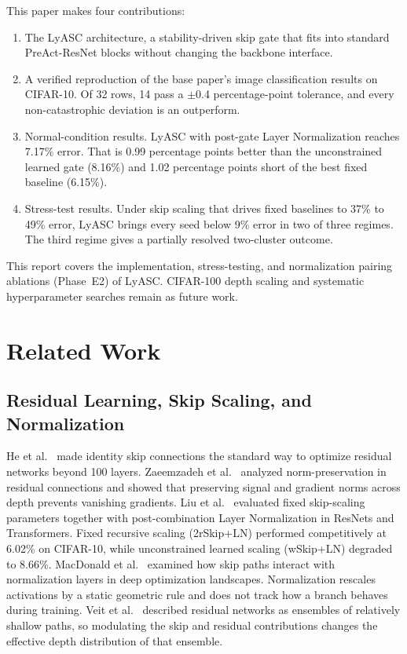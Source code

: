 \documentclass[conference,10pt]{IEEEtran}
\begin{document}
This paper makes four contributions:
\begin{enumerate}
    \item The LyASC architecture, a stability-driven skip gate that
    fits into standard PreAct-ResNet blocks without changing the
    backbone interface.
    \item A verified reproduction of the base paper's image
    classification results on CIFAR-10. Of 32 rows, 14 pass a
    $\pm$0.4 percentage-point tolerance, and every non-catastrophic
    deviation is an outperform.
    \item Normal-condition results. LyASC with post-gate Layer
    Normalization reaches 7.17\% error. That is 0.99 percentage points
    better than the unconstrained learned gate (8.16\%) and 1.02
    percentage points short of the best fixed baseline (6.15\%).
    \item Stress-test results. Under skip scaling that drives fixed
    baselines to 37\% to 49\% error, LyASC brings every seed below 9\%
    error in two of three regimes. The third regime gives a partially
    resolved two-cluster outcome.
\end{enumerate}

This report covers the implementation, stress-testing, and normalization pairing ablations (Phase~E2) of LyASC. CIFAR-100 depth scaling and systematic hyperparameter searches remain as future work.


\section{Related Work}

\subsection{Residual Learning, Skip Scaling, and Normalization}

He et al.~\cite{he2016deep, he2016identity} made identity skip
connections the standard way to optimize residual networks beyond 100
layers. Zaeemzadeh et al.~\cite{zaeemzadeh2020norm} analyzed
norm-preservation in residual connections and showed that preserving
signal and gradient norms across depth prevents vanishing gradients.
Liu et al.~\cite{liu2021rethinking} evaluated fixed skip-scaling
parameters together with post-combination Layer Normalization in ResNets
and Transformers. Fixed recursive scaling (2rSkip+LN) performed
competitively at 6.02\% on CIFAR-10, while unconstrained learned scaling
(wSkip+LN) degraded to 8.66\%. MacDonald et al.~\cite{macdonald2023skip}
examined how skip paths interact with normalization layers in deep
optimization landscapes. Normalization rescales activations by a static
geometric rule and does not track how a branch behaves during training.
Veit et al.~\cite{veit2016residual} described residual networks as
ensembles of relatively shallow paths, so modulating the skip and
residual contributions changes the effective depth distribution of that
ensemble.
\end{document}
